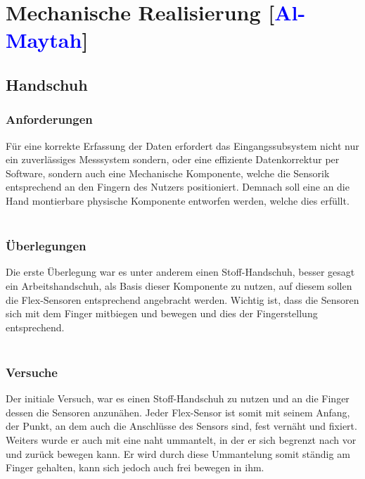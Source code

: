 \documentclass[titlepage,12pt,twoside]{article}
\begin{document}
\newpage
\section{Mechanische Realisierung [\textcolor{blue}{Al-Maytah}]}
\label{chap:Mechanische Realisierung}

\subsection{Handschuh}
\subsubsection{Anforderungen}
Für eine korrekte Erfassung der Daten erfordert das Eingangssubsystem nicht nur ein 
zuverlässiges Messsystem sondern, oder eine effiziente Datenkorrektur per Software, 
sondern auch eine Mechanische Komponente, welche die Sensorik entsprechend an den 
Fingern des Nutzers positioniert. Demnach soll eine an die Hand montierbare physische 
Komponente entworfen werden, welche dies erfüllt. \\
\\
\subsubsection{Überlegungen}
Die erste Überlegung war es unter anderem einen Stoff-Handschuh, besser gesagt ein 
Arbeitshandschuh, als Basis dieser Komponente zu nutzen, auf diesem sollen die 
Flex-Sensoren entsprechend angebracht werden. Wichtig ist, dass die Sensoren sich 
mit dem Finger mitbiegen und bewegen und dies der Fingerstellung entsprechend. \\
\\
\subsubsection{Versuche}
Der initiale Versuch, war es einen Stoff-Handschuh zu nutzen und an die Finger 
dessen die Sensoren anzunähen. Jeder Flex-Sensor ist somit mit seinem Anfang, der 
Punkt, an dem auch die Anschlüsse des Sensors sind, fest vernäht und fixiert. Weiters 
wurde er auch mit eine naht ummantelt, in der er sich begrenzt nach vor und zurück 
bewegen kann. Er wird durch diese Ummantelung somit ständig am Finger gehalten, kann 
sich jedoch auch frei bewegen in ihm. \\
\\
\end{document}
